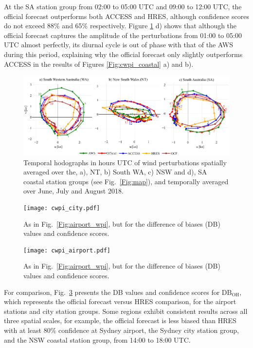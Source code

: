 \documentclass[twocol]{ametsoc}
\begin{document}
At the SA station group from 02:00 to 05:00 UTC and 09:00 to 12:00 UTC, the official forecast outperforms both ACCESS and HRES, although confidence scores do not exceed 88\% and 65\% respectively. Figure \ref{Fig:clim_hodo} d) shows that although the official forecast captures the amplitude of the perturbations from 01:00 to 05:00 UTC almost perfectly, its diurnal cycle is out of phase with that of the AWS during this period, explaining why the official forecast only slightly outperforms ACCESS in the results of Figures \ref{Fig:cwpi_coastal} a) and b).

\begin{figure}
\centering
\includegraphics[width=39pc]{clim_hodo_alt.pdf}
\caption{Temporal hodographs in hours UTC of wind perturbations spatially averaged over the, a), NT, b) South WA, c) NSW and d), SA coastal station groups (see Fig.~\ref{Fig:map}), and temporally averaged over June, July and August 2018.}
\label{Fig:clim_hodo}
\end{figure}

\begin{figure}
\centering
\texttt{[image: cwpi\_city.pdf]}
\caption{As in Fig.~\ref{Fig:airport_wpi}, but for the difference of biases (DB) values and confidence scores.}
\label{Fig:airport_cwpi}
\end{figure}

\begin{figure}
\centering
\texttt{[image: cwpi\_airport.pdf]}
\caption{As in Fig.~\ref{Fig:airport_wpi}, but for the difference of biases (DB) values and confidence scores.}
\label{Fig:airport_cwpi}
\end{figure}

For comparison, Fig.~\ref{Fig:airport_cwpi} presents the DB values and confidence scores for $\text{DB}_\text{OH}$, which represents the official forecast versus HRES comparison, for the airport stations and city station groups. Some regions exhibit consistent results across all three spatial scales, for example, the official forecast is less biased than HRES with at least $80 \%$ confidence at Sydney airport, the Sydney city station group, and the NSW coastal station group, from 14:00 to 18:00 UTC.  
\end{document}
